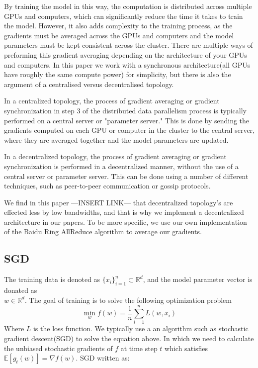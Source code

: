 \documentclass[11pt]{article}
\begin{document}
By training the model in this way, the computation is distributed across multiple GPUs and computers, which can significantly reduce the time it takes to train the model. However, it also adds complexity to the training process, as the gradients must be averaged across the GPUs and computers and the model parameters must be kept consistent across the cluster. There are multiple ways of preforming this gradient averaging depending on the architecture of your GPUs and computers. In this paper we work with a synchronous architecture(all GPUs have roughly the same compute power) for simplicity, but there is also the argument of a centralised versus decentralised topology.

In a centralized topology, the process of gradient averaging or gradient synchronization in step 3 of the distributed data parallelism process is typically performed on a central server or "parameter server." This is done by sending the gradients computed on each GPU or computer in the cluster to the central server, where they are averaged together and the model parameters are updated.

In a decentralized topology, the process of gradient averaging or gradient synchronization is performed in a decentralized manner, without the use of a central server or parameter server. This can be done using a number of different techniques, such as peer-to-peer communication or gossip protocols.

We find in this paper ---INSERT LINK--- that decentralized topology's are effected less by low bandwidths, and that is why we implement a decentralized architecture in our papers. To be more specific, we use our own implementation of the Baidu Ring AllReduce algorithm to average our gradients.

\subsection{SGD}

The training data is denoted as $\{x_i\}^n_{i=1} \subset \mathbb{R}^d$, and the model parameter vector is donated as\\ $w \in \mathbb{R}^d$. The goal of training is to solve the following optimization problem 
$$
\min_w f
(w) = \frac{1}{n} \sum^n_{i=1}L(w,x_i)
$$
Where $L$ is the loss function. We typically use a an algorithm such as stochastic gradient descent(SGD) to solve the equation above. In which we need to calculate the unbiased stochastic gradients of $f$ at time step $t$ which satisfies $\mathbb{E}[g_t(w)] = {\nabla} f(w)$. SGD written as:
\end{document}
